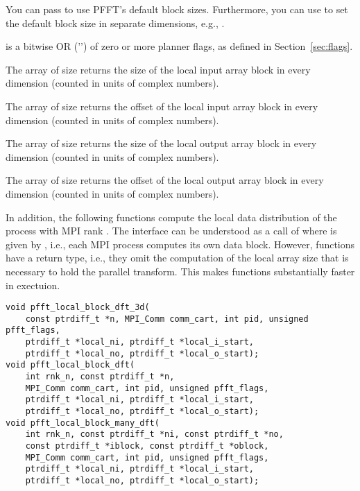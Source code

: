 \begin{compactitem}
        You can pass  to use PFFT's default block sizes. Furthermore, you can use  to set
        the default block size in separate dimensions, e.g., .
  \item {} is a bitwise OR ('\code{|}') of zero or more planner flags, as defined in Section~\ref{sec:flags}.
  \item The array  of size  returns the size of the local input array block in every dimension (counted in units of complex numbers).
  \item The array  of size  returns the offset of the local input array block in every dimension (counted in units of complex numbers).
  \item The array  of size  returns the size of the local output array block in every dimension (counted in units of complex numbers).
  \item The array  of size  returns the offset of the local output array block in every dimension (counted in units of complex numbers).
\end{compactitem}

In addition, the following  functions compute the local data distribution of the process with MPI rank .
The  interface can be understood as a call of  where
 is given by , i.e., each MPI process computes its own data block.
However,  functions have a  return type, i.e., they omit the computation of the local array size
that is necessary to hold the parallel transform. This makes  functions substantially faster in exectuion.
\begin{lstlisting}
void pfft_local_block_dft_3d(
    const ptrdiff_t *n, MPI_Comm comm_cart, int pid, unsigned pfft_flags,
    ptrdiff_t *local_ni, ptrdiff_t *local_i_start,
    ptrdiff_t *local_no, ptrdiff_t *local_o_start);
void pfft_local_block_dft(
    int rnk_n, const ptrdiff_t *n,
    MPI_Comm comm_cart, int pid, unsigned pfft_flags,
    ptrdiff_t *local_ni, ptrdiff_t *local_i_start,
    ptrdiff_t *local_no, ptrdiff_t *local_o_start);
void pfft_local_block_many_dft(
    int rnk_n, const ptrdiff_t *ni, const ptrdiff_t *no,
    const ptrdiff_t *iblock, const ptrdiff_t *oblock,
    MPI_Comm comm_cart, int pid, unsigned pfft_flags,
    ptrdiff_t *local_ni, ptrdiff_t *local_i_start,
    ptrdiff_t *local_no, ptrdiff_t *local_o_start);
\end{lstlisting}


